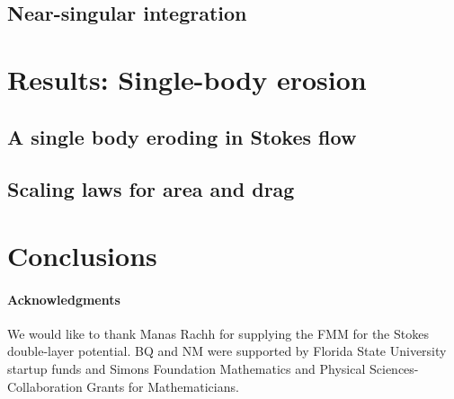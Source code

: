 \documentclass[preprint, 10pt]{elsarticle}
\begin{document}
\subsection{Near-singular integration}
\label{sec:NSI}

\section{Results: Single-body erosion}
\label{s:SingleResults}

\subsection{A single body eroding in Stokes flow}

\subsection{Scaling laws for area and drag}
\label{sec:scaling}


\section{Conclusions\label{s:conclusions}}


\paragraph{\bf Acknowledgments} We would like to thank Manas Rachh for
supplying the FMM for the Stokes double-layer potential. BQ and NM were
supported by Florida State University startup funds and Simons
Foundation Mathematics and Physical Sciences-Collaboration Grants for
Mathematicians.

 

\end{document}
